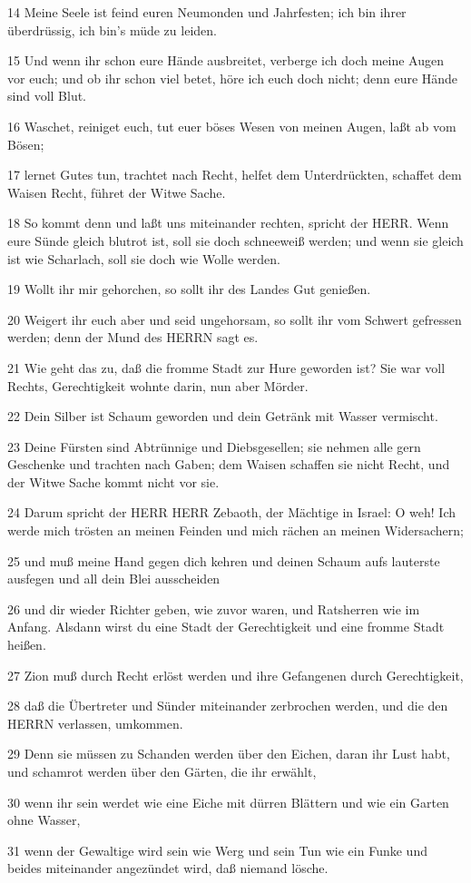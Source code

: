 \par 14 Meine Seele ist feind euren Neumonden und Jahrfesten; ich bin ihrer überdrüssig, ich bin's müde zu leiden.
\par 15 Und wenn ihr schon eure Hände ausbreitet, verberge ich doch meine Augen vor euch; und ob ihr schon viel betet, höre ich euch doch nicht; denn eure Hände sind voll Blut.
\par 16 Waschet, reiniget euch, tut euer böses Wesen von meinen Augen, laßt ab vom Bösen;
\par 17 lernet Gutes tun, trachtet nach Recht, helfet dem Unterdrückten, schaffet dem Waisen Recht, führet der Witwe Sache.
\par 18 So kommt denn und laßt uns miteinander rechten, spricht der HERR. Wenn eure Sünde gleich blutrot ist, soll sie doch schneeweiß werden; und wenn sie gleich ist wie Scharlach, soll sie doch wie Wolle werden.
\par 19 Wollt ihr mir gehorchen, so sollt ihr des Landes Gut genießen.
\par 20 Weigert ihr euch aber und seid ungehorsam, so sollt ihr vom Schwert gefressen werden; denn der Mund des HERRN sagt es.
\par 21 Wie geht das zu, daß die fromme Stadt zur Hure geworden ist? Sie war voll Rechts, Gerechtigkeit wohnte darin, nun aber Mörder.
\par 22 Dein Silber ist Schaum geworden und dein Getränk mit Wasser vermischt.
\par 23 Deine Fürsten sind Abtrünnige und Diebsgesellen; sie nehmen alle gern Geschenke und trachten nach Gaben; dem Waisen schaffen sie nicht Recht, und der Witwe Sache kommt nicht vor sie.
\par 24 Darum spricht der HERR HERR Zebaoth, der Mächtige in Israel: O weh! Ich werde mich trösten an meinen Feinden und mich rächen an meinen Widersachern;
\par 25 und muß meine Hand gegen dich kehren und deinen Schaum aufs lauterste ausfegen und all dein Blei ausscheiden
\par 26 und dir wieder Richter geben, wie zuvor waren, und Ratsherren wie im Anfang. Alsdann wirst du eine Stadt der Gerechtigkeit und eine fromme Stadt heißen.
\par 27 Zion muß durch Recht erlöst werden und ihre Gefangenen durch Gerechtigkeit,
\par 28 daß die Übertreter und Sünder miteinander zerbrochen werden, und die den HERRN verlassen, umkommen.
\par 29 Denn sie müssen zu Schanden werden über den Eichen, daran ihr Lust habt, und schamrot werden über den Gärten, die ihr erwählt,
\par 30 wenn ihr sein werdet wie eine Eiche mit dürren Blättern und wie ein Garten ohne Wasser,
\par 31 wenn der Gewaltige wird sein wie Werg und sein Tun wie ein Funke und beides miteinander angezündet wird, daß niemand lösche.

